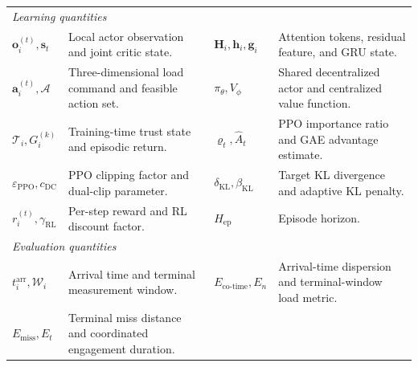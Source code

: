 \documentclass[lettersize,journal]{IEEEtran}
\providecommand{\DIFadd}[1]{{\protect\color{blue}#1}} %
\providecommand{\DIFaddend}{} %
\providecommand{\DIFaddFL}[1]{\DIFadd{#1}} %
\DeclareRobustCommand{\DIFaddend}{\DIFOaddend \let\includegraphics\DIFOincludegraphics} %
\begin{document}
\begin{table}[!t]
\begin{tabular}{@{}p{}p{}p{}p{}@{}}
\midrule
\multicolumn{4}{l}{\emph{Learning quantities}}\\
\DIFaddFL{$\mathbf o_i^{(t)},\mathbf s_t$ }& \DIFaddFL{Local actor observation and joint critic state. }&
\DIFaddFL{$\mathbf H_i,\mathbf h_i,\mathbf g_i$ }& \DIFaddFL{Attention tokens, residual feature, and GRU state.}\\
\DIFaddFL{$\mathbf a_i^{(t)},\mathcal A$ }& \DIFaddFL{Three-dimensional load command and feasible action set. }&
\DIFaddFL{$\pi_\theta,V_\phi$ }& \DIFaddFL{Shared decentralized actor and centralized value function.}\\
\DIFaddFL{$\mathcal T_i,G_i^{(k)}$ }& \DIFaddFL{Training-time trust state and episodic return. }&
\DIFaddFL{$\varrho_t,\widehat A_t$ }& \DIFaddFL{PPO importance ratio and GAE advantage estimate.}\\
\DIFaddFL{$\varepsilon_{\mathrm{PPO}},c_{\mathrm{DC}}$ }& \DIFaddFL{PPO clipping factor and dual-clip parameter. }&
\DIFaddFL{$\delta_{\mathrm{KL}},\beta_{\mathrm{KL}}$ }& \DIFaddFL{Target KL divergence and adaptive KL penalty.}\\
\DIFaddFL{$r_i^{(t)},\gamma_{\mathrm{RL}}$ }& \DIFaddFL{Per-step reward and RL discount factor. }&
\DIFaddFL{$H_{\mathrm{ep}}$ }& \DIFaddFL{Episode horizon.}\\
\midrule
\multicolumn{4}{l}{\emph{Evaluation quantities}}\\
\DIFaddFL{$t_i^{\mathrm{arr}},\mathcal W_i$ }& \DIFaddFL{Arrival time and terminal measurement window. }&
\DIFaddFL{$E_{\mathrm{co\text{-}time}},E_n$ }& \DIFaddFL{Arrival-time dispersion and terminal-window load metric.}\\
\DIFaddFL{$E_{\mathrm{miss}},E_t$ }& \DIFaddFL{Terminal miss distance and coordinated engagement duration. }& & \\
\bottomrule
\end{tabular}
\end{table}
 \DIFaddend 
\end{document}
